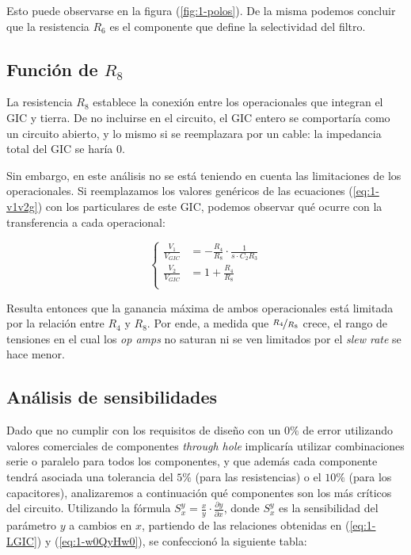 \documentclass[../../tc_tp3_main.tex]{subfiles}
\begin{document}
Esto puede observarse en la figura (\ref{fig:1-polos}). De la misma podemos concluir que la resistencia $R_6$ es el componente que define la selectividad del filtro.


\subsection{Funci\'on de $R_8$}

La resistencia $R_8$ establece la conexi\'on entre los operacionales que integran el GIC y tierra. De no incluirse en el circuito, el GIC entero se comportar\'ia como un circuito abierto, y lo mismo si se reemplazara por un cable: la impedancia total del GIC se har\'ia 0. \par

Sin embargo, en este an\'alisis no se est\'a teniendo en cuenta las limitaciones de los operacionales. Si reemplazamos los valores gen\'ericos de las ecuaciones (\ref{eq:1-v1v2g}) con los particulares de este GIC, podemos observar qu\'e ocurre con la transferencia a cada operacional:

\begin{equation}
	\left\{
	 	\begin{aligned}
			\frac{V_1}{V_{GIC}} &= -\frac{R_4}{R_8} \cdot \frac{1}{s\cdot C_2 R_3}\\
			\frac{V_2}{V_{GIC}} &= 1+ \frac{R_4}{R_8} \\ 
		\end{aligned}
	\right.
	\label{eq:v1v2vgic}
 \end{equation}

Resulta entonces que la ganancia m\'axima de ambos operacionales est\'a limitada por la relaci\'on entre $R_4$ y $R_8$. Por ende, a medida que $\nicefrac{R_4}{R_8}$ crece, el rango de tensiones en el cual los \textit{op amps} no saturan ni se ven limitados por el \textit{slew rate} se hace menor. \par



\subsection{An\'alisis de sensibilidades}

Dado que no cumplir con los requisitos de dise\~no con un $0\%$ de error utilizando valores comerciales de componentes \textit{through hole} implicar\'ia utilizar combinaciones serie o paralelo para todos los componentes, y que adem\'as cada componente tendr\'a asociada una tolerancia del $5\%$ (para las resistencias) o el $10\%$ (para los capacitores), analizaremos a continuaci\'on qu\'e componentes son los m\'as cr\'iticos del circuito. Utilizando la f\'ormula $S_{x}^{y} = \frac{x}{y} \cdot  \frac{\partial y}{\partial x}$, donde $S_x^y$ es la sensibilidad del par\'ametro $y$ a cambios en $x$, partiendo de las relaciones obtenidas en (\ref{eq:1-LGIC}) y (\ref{eq:1-w0QyHw0}), se confeccion\'o la siguiente tabla:
\end{document}
